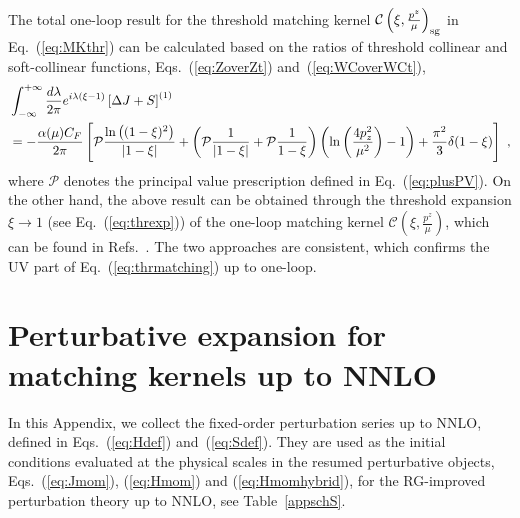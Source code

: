 \documentclass[a4paper,11pt]{article}
\begin{document}
The total one-loop result for the threshold matching kernel $\mathcal{C}\left(\xi,\frac{p^z}{\mu}\right)_{\rm sg}$ in Eq.~(\ref{eq:MKthr}) can be calculated based on the ratios of threshold collinear and soft-collinear functions, Eqs.~(\ref{eq:ZoverZt}) and~(\ref{eq:WCoverWCt}),
\begin{align}\label{eq:TRmatchUV}
&\int_{-\infty}^{+\infty} \frac{d\lambda}{2\pi} e^{i \lambda (\xi-1)} \left[\Delta J+S \right]^{(1)} \nonumber\\
&= - \frac{\alpha(\mu) C_F}{2 \pi} \left[ {\cal P}\frac{\ln\left( (1-\xi)^2 \right)}{|1-\xi|} + \left({\cal P} \frac{1}{|1-\xi|} + {\cal P}\frac{1}{1-\xi}\right)\left(\ln\left(\frac{4 p_z^2}{\mu^2}\right)-1\right) + \frac{\pi^2}{3} \delta(1-\xi)
\right] \ ,
\end{align}
where $\mathcal{P}$ denotes the principal value prescription defined in Eq.~(\ref{eq:plusPV}). On the other hand, the above result can be obtained through the threshold expansion $\xi \rightarrow 1$ (see Eq.~(\ref{eq:threxp})) of the one-loop matching kernel $\mathcal{C}\left(\xi,\frac{p^z}{\mu}\right)$, which can be found in Refs.~\cite{Xiong:2013bka,Izubuchi:2018srq,Ji:2020ect}. 
The two approaches are consistent, which confirms the UV part of Eq.~(\ref{eq:thrmatching}) up to one-loop. 



\section{Perturbative expansion for matching kernels up to NNLO}\label{sec:fix}
In this Appendix, we collect the fixed-order perturbation series up to NNLO, defined in Eqs.~(\ref{eq:Hdef}) and~(\ref{eq:Sdef}). They are used as the initial conditions evaluated at the physical scales in the resumed perturbative objects, Eqs.~(\ref{eq:Jmom}), (\ref{eq:Hmom}) and (\ref{eq:Hmomhybrid}), for the RG-improved perturbation theory up to NNLO, see Table~\ref{appschS}.  
\end{document}

